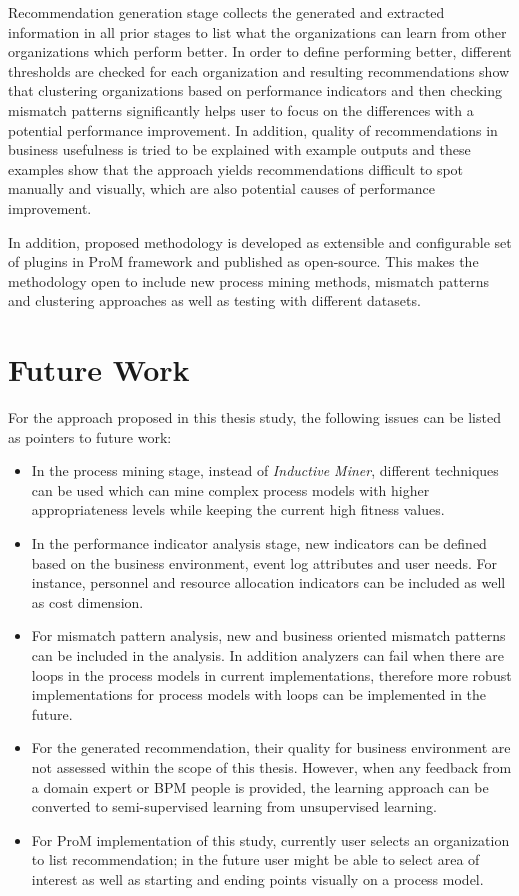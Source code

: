 Recommendation generation stage collects the generated and extracted information in all prior stages to list what the organizations can learn from other organizations which perform better. In order to define performing better, different thresholds are checked for each organization and resulting recommendations show that clustering organizations based on performance indicators and then checking mismatch patterns significantly helps user to focus on the differences with a potential performance improvement. In addition, quality of recommendations in business usefulness is tried to be explained with example outputs and these examples show that the approach yields recommendations difficult to spot manually and visually, which are also potential causes of performance improvement.

In addition, proposed methodology is developed as extensible and configurable set of plugins in ProM framework \cite{verbeek2010prom} and published as open-source. This makes the methodology open to include new process mining methods, mismatch patterns and clustering approaches as well as testing with different datasets.

\section{Future Work}

For the approach proposed in this thesis study, the following issues can be listed as pointers to future work:
\begin{itemize}
	\item In the process mining stage, instead of \textit{Inductive Miner}, different techniques can be used which can mine complex process models with higher appropriateness levels while keeping the current high fitness values.
	\item In the performance indicator analysis stage, new indicators can be defined based on the business environment, event log attributes and user needs. For instance, personnel and resource allocation indicators can be included as well as cost dimension.
	\item For mismatch pattern analysis, new and business oriented mismatch patterns can be included in the analysis. In addition analyzers can fail when there are loops in the process models in current implementations, therefore more robust implementations for process models with loops can be implemented in the future.
	\item For the generated recommendation, their quality for business environment are not assessed within the scope of this thesis. However, when any feedback from a domain expert or BPM people is provided, the learning approach can be converted to semi-supervised learning from unsupervised learning.
	\item For ProM implementation of this study, currently user selects an organization to list recommendation; in the future user might be able to select area of interest as well as starting and ending points visually on a process model. 
\end{itemize}